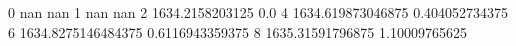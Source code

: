 0 nan nan
1 nan nan
2 1634.2158203125 0.0
4 1634.619873046875 0.404052734375
6 1634.8275146484375 0.6116943359375
8 1635.31591796875 1.10009765625
